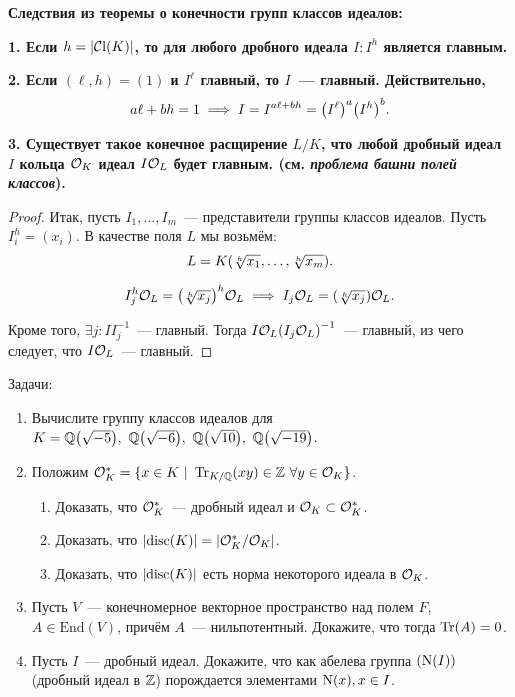 	\noindent\bf{Следствия из теоремы о конечности групп классов идеалов:}

	\bf{1.} Если $h = \left\lvert \Class(K) \right\rvert$,  то для любого дробного идеала $I\colon I^{h}$ является главным.

	\bf{2.} Если $(\ell, h) = (1)$ и $I^{\ell}$ главный, то $I$~--- главный. Действительно, 
	\[
		a\ell + bh = 1 \implies I = I^{a\ell + bh} = \lr*{I^{\ell}}^{a} \lr*{I^{h}}^{b}.
	\]

	\bf{3.} Существует такое конечное расщирение $L/K$, что любой дробный идеал $I$ кольца $\cO_{K}$ идеал $I\cO_{L}$ будет главным. (см. \emph{проблема башни полей классов}).
	\begin{proof}
		Итак, пусть $I_1, \ldots, I_{m}$~--- представители группы классов идеалов. Пусть $I_i^{h} = (x_i)$. В качестве поля $L$ мы возьмём: 
		\[
			L = K\lr*{\sqrt[h]{x_1}, \ldots, \sqrt[h]{x_m}}.
		\]

		\[
			I_{j}^h \cO_{L} = \lr*{\sqrt[h]{x_j}}^{h}\cO_{L} \implies I_j\cO_{L} = (\sqrt[h]{x_j})\cO_{L}. 
		\]

		Кроме того, $\exists j\colon I I_{j}^{-1}$~--- главный. Тогда $I \cO_{L} \lr*{I_{j}\cO_{L}}^{-1}$~--- главный, из чего следует, что $I \cO_{L}$~--- главный. 
	\end{proof}

	\begin{homework}\label{hw_6}
		Задачи: 
		\begin{enumerate}
			\item Вычислите группу классов идеалов для $K = \Q\lr*{\sqrt{-5}}, \ \Q\lr*{\sqrt{-6}}, \ \Q\lr*{\sqrt{10}}, \ \Q\lr*{\sqrt{-19}}$.

			\item Положим $\cO_{K}^{*} = \{ x \in K \ \vert \ \Tr_{K/\Q}(xy) \in \Z \ \forall y \in \cO_{K} \}$.
				\begin{enumerate}
					\item Доказать, что $\cO_{K}^{*}$~--- дробный идеал и $\cO_{K} \subset \cO_{K}^{*}$.

					\item Доказать, что $\left\lvert \disc(K) \right\rvert = \left\lvert \cO_{K}^*/\cO_{K} \right\rvert$.

					\item Доказать, что $\left\lvert \disc(K) \right\rvert$ есть норма некоторого идеала в $\cO_{K}$.
				\end{enumerate}
			\item Пусть $V$~--- конечномерное векторное пространство над полем $F$, $A \in \mathrm{End}(V)$, причём $A$~--- нильпотентный. Докажите, что тогда $\Tr(A) = 0$.

			\item Пусть $I$~--- дробный идеал. Докажите, что как абелева группа $\lr*{\Nm(I)}$ (дробный идеал в $\Z$) порождается элементами $\Nm(x), x \in I$.
		\end{enumerate}

	\end{homework}




	